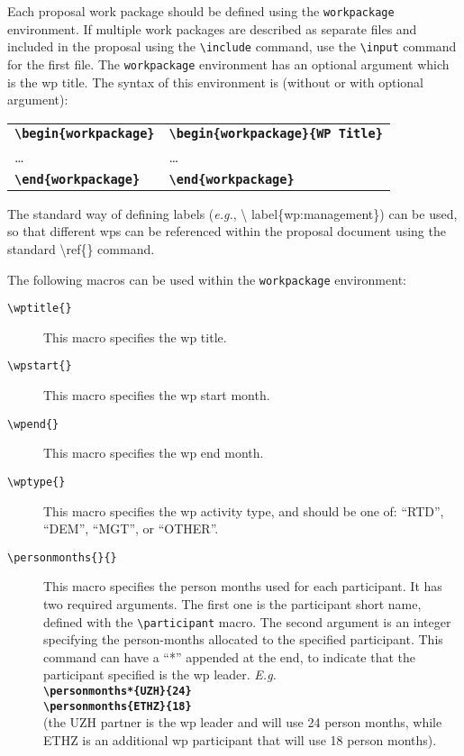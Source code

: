 \documentclass[pdftext]{article}
\begin{document}
Each proposal work package should be defined using the
\texttt{workpackage} environment. If multiple work packages are
described as separate files and included in the proposal using the
\texttt{\textbackslash include} command, use the
\texttt{\textbackslash input} command for the first file.  The
\texttt{workpackage} environment has an optional argument which is the
wp title. The syntax of this
environment is (without or with optional argument):\\
\begin{center}
\begin{tabular}{l | l}
\textbf{\texttt{\textbackslash begin\{workpackage\}}} &
\textbf{\texttt{\textbackslash begin\{workpackage\}\{WP Title\}}} \\
\ldots & \ldots \\
\textbf{\texttt{\textbackslash end\{workpackage\}}} & 
\textbf{\texttt{\textbackslash end\{workpackage\}}}
\end{tabular}
\end{center}

The standard way of defining labels (\emph{e.g.}, \textbackslash
label\{wp:management\}) can be used, so that different wps can be
referenced within the proposal document using the standard
\textbackslash ref\{\} command.

The following macros can be used within the \texttt{workpackage}
environment:
\begin{description}
\item[\texttt{\textbackslash wptitle\{\}}] This macro specifies the wp
  title.
\item[\texttt{\textbackslash wpstart\{\}}] This macro specifies the wp
  start month.
\item[\texttt{\textbackslash wpend\{\}}] This macro specifies the wp
  end month.
\item[\texttt{\textbackslash wptype\{\}}] This macro specifies the wp
  activity type, and should be one of: ``RTD'', ``DEM'', ``MGT'', or
  ``OTHER''.
\item[\texttt{\textbackslash personmonths\{\}\{\}}] This macro
  specifies the person months used for each participant. It has two
  required arguments. The first one is the participant short name,
  defined with the \texttt{\textbackslash participant} macro. The
  second argument is an integer specifying the person-months allocated
  to the specified participant. This command can have a ``*'' appended
  at the end, to indicate that the participant specified is the wp
  leader. \emph{E.g.}\\
  \textbf{\texttt{\textbackslash personmonths*\{UZH\}\{24\}}}\\
  \textbf{\texttt{\textbackslash personmonths\{ETHZ\}\{18\}}}\\
  (the UZH partner is the wp leader and will use 24 person months,
  while ETHZ is an additional wp participant that will use 18 person
  months).
\end{description}
\end{document}
